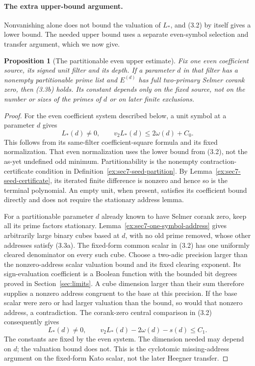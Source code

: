 \documentclass[11pt]{article}
\newtheorem{proposition}[theorem]{Proposition}
\theoremstyle{definition}
\theoremstyle{remark}
\begin{document}
\paragraph{The extra upper-bound argument.}
Nonvanishing alone does not bound the valuation of $L_*$, and (3.2)
by itself gives a lower bound. The needed upper bound uses a separate
even-symbol selection and transfer argument, which we now give.

\begin{proposition}[The partitionable even upper estimate]\label{ex:sec7-even-upper}
Fix one even coefficient source, its signed unit filter and its depth.
If a parameter $d$ in that filter has a nonempty partitionable prime
list and $E^{(d)}$ has full two-primary Selmer corank zero, then (3.3b)
holds. Its constant depends only on the fixed source, not on the
number or sizes of the primes of $d$ or on later finite exclusions.
\end{proposition}
\begin{proof}\leavevmode
For the even coefficient system described below, a unit symbol at a
parameter $d$ gives
\[
       L_*(d)\ne0,\qquad v_2L_*(d)\le2\omega(d)+C_0.              \tag{3.3a}
\]
This follows from its same-filter coefficient-square formula and its
fixed normalization. That even normalization uses the lower bound
from (3.2), not the as-yet undefined odd minimum.
Partitionability is the nonempty contraction-certificate condition in
Definition~\ref{ex:sec7-seed-partition}. By
Lemma~\ref{ex:sec7-seed-certificate}, its iterated finite difference
is nonzero and hence so is the terminal polynomial. An empty unit,
when present, satisfies its coefficient bound directly and does not
require the stationary address lemma.

For a partitionable parameter $d$ already known to have Selmer
corank zero, keep all its prime factors stationary.
Lemma~\ref{ex:sec7-one-symbol-address} gives arbitrarily large binary
cubes based at
$d$, with no old prime removed, whose other addresses satisfy (3.3a).
The fixed-form common scalar in (3.2) has one uniformly cleared
denominator on every such cube. Choose a two-adic precision larger
than the nonzero-address scalar valuation bound and its fixed
clearing exponent. Its sign-evaluation coefficient is a Boolean
function with the bounded bit degrees proved in
Section~\ref{sec:limits}. A cube dimension larger than their sum
therefore supplies a nonzero address congruent to the base at this
precision. If the base scalar were zero or had larger valuation than
the bound, so would that nonzero address, a contradiction.
The corank-zero central comparison in (3.2) consequently gives
\[
 L_*(d)\ne0,\qquad
             v_2L_*(d)-2\omega(d)-s(d)\le C_1.                  \tag{3.3b}
\]
The constants are fixed by the even system. The dimension needed
may depend on $d$; the valuation bound does not. This is the
cyclotomic missing-address argument on the fixed-form Kato scalar,
not the later Heegner transfer.
\end{proof}
\end{document}

